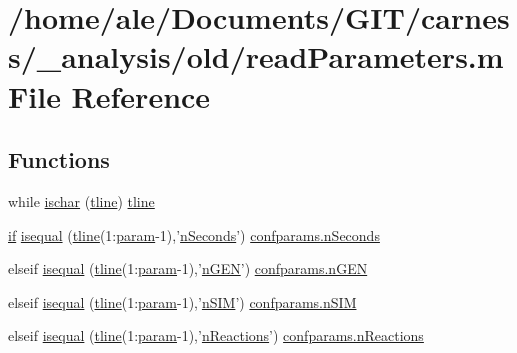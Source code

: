 \hypertarget{a00027}{\section{/home/ale/\-Documents/\-G\-I\-T/carness/\-\_\-analysis/old/read\-Parameters.m File Reference}
\label{a00027}
}
\subsection*{Functions}
\begin{DoxyCompactItemize}
\item 
while \hyperlink{a00027_a1cefc2ab6209d3abc585818a38c20195}{ischar} (\hyperlink{a00027_a6791897869706b835f1a5d305739a415}{tline}) \hyperlink{a00027_a6791897869706b835f1a5d305739a415}{tline}
\item 
\hyperlink{a00024_a01d55766b8058903dd360b4bda71f9f5}{if} \hyperlink{a00027_a9609808cef745ad8ee18e35e55a1fbf1}{isequal} (\hyperlink{a00027_a6791897869706b835f1a5d305739a415}{tline}(1\-:\hyperlink{a00027_a51f20d6b1b54a2eee3be0e8adc96a0ae}{param}-\/1),'\hyperlink{a00064_aaded2f2d61413dc4bddf805e9be03ded}{n\-Seconds}') \hyperlink{a00064_aaded2f2d61413dc4bddf805e9be03ded}{confparams.\-n\-Seconds}
\item 
elseif \hyperlink{a00027_a302e40bc97d43406841d0fa4246f1d6a}{isequal} (\hyperlink{a00027_a6791897869706b835f1a5d305739a415}{tline}(1\-:\hyperlink{a00027_a51f20d6b1b54a2eee3be0e8adc96a0ae}{param}-\/1),'\hyperlink{a00065_a4c8fe523edbe179c5d215da13f469f72}{n\-G\-E\-N}') \hyperlink{a00065_a4c8fe523edbe179c5d215da13f469f72}{confparams.\-n\-G\-E\-N}
\item 
elseif \hyperlink{a00027_a00a640dfb4748b56c2891827afa0f8c9}{isequal} (\hyperlink{a00027_a6791897869706b835f1a5d305739a415}{tline}(1\-:\hyperlink{a00027_a51f20d6b1b54a2eee3be0e8adc96a0ae}{param}-\/1),'\hyperlink{a00065_adb2acbd590bcb59c7b4e633c250f3f28}{n\-S\-I\-M}') \hyperlink{a00065_adb2acbd590bcb59c7b4e633c250f3f28}{confparams.\-n\-S\-I\-M}
\item 
elseif \hyperlink{a00027_a57f0bc660f71fe01077b105f43cb46ee}{isequal} (\hyperlink{a00027_a6791897869706b835f1a5d305739a415}{tline}(1\-:\hyperlink{a00027_a51f20d6b1b54a2eee3be0e8adc96a0ae}{param}-\/1),'\hyperlink{a00065_a8d704532b4b419f1428cb078bb5c7ffe}{n\-Reactions}') \hyperlink{a00065_a8d704532b4b419f1428cb078bb5c7ffe}{confparams.\-n\-Reactions}
\item 

\end{DoxyCompactItemize}
